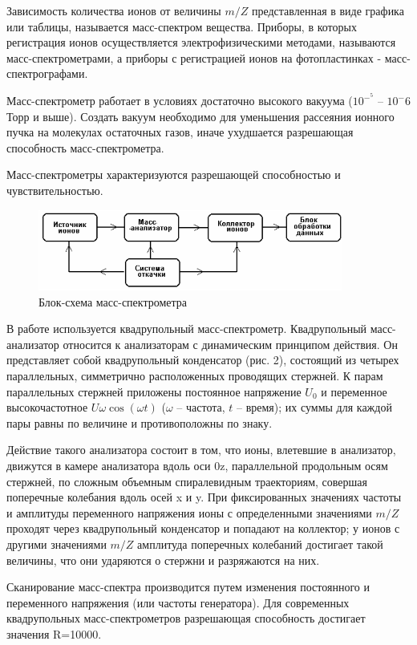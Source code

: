 \documentclass[a4paper]{article}
\begin{document}
Зависимость количества ионов от величины $m/Z$ представленная в виде графика или таблицы,
называется масс-спектром вещества. Приборы, в которых регистрация ионов осуществляется
электрофизическими методами, называются масс-спектрометрами, а приборы с регистрацией ионов на
фотопластинках - масс-спектрографами. \par
Масс-спектрометр работает в условиях достаточно высокого вакуума ($10^-^5$ – $10^-6$ Торр и выше). Создать вакуум необходимо для уменьшения рассеяния ионного пучка на молекулах остаточных газов, иначе ухудшается разрешающая способность масс-спектрометра. \par
Масс-спектрометры характеризуются разрешающей способностью и чувствительностью.

\begin{figure}[h]
\begin{center}
\includegraphics[width=10cm]{fig1.PNG}
\caption{Блок-схема масс-спектрометра}
\label{ris:experimoriginal} %

\end{center}
\end{figure}

В работе используется квадрупольный масс-спектрометр. Квадрупольный масс-анализатор относится к анализаторам с динамическим принципом действия. Он представляет собой квадрупольный конденсатор (рис. 2), состоящий из четырех параллельных, симметрично расположенных проводящих стержней. К парам параллельных стержней приложены постоянное напряжение $U_0$ и переменное высокочастотное $U\omega \cos(\omega t)$ ($\omega$ – частота, $t$ – время); их суммы для каждой пары равны по величине и противоположны по знаку. \par

Действие такого анализатора состоит в том, что ионы, влетевшие в анализатор, движутся в камере анализатора вдоль оси 0z, параллельной продольным осям стержней, по сложным объемным спиралевидным траекториям, совершая поперечные колебания вдоль осей x и y. При фиксированных значениях частоты и амплитуды переменного напряжения ионы с определенными значениями $m/Z$ проходят через квадрупольный конденсатор и попадают на коллектор; у ионов с другими значениями $m/Z$ амплитуда поперечных колебаний достигает такой величины, что они ударяются о стержни и разряжаются на них. \par Сканирование масс-спектра производится путем изменения постоянного и переменного напряжения (или частоты генератора). Для современных квадрупольных масс-спектрометров разрешающая способность достигает значения R=10000.
\end{document}
